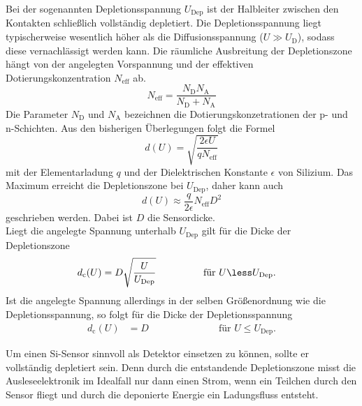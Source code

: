 Bei der sogenannten Depletionsspannung $U_\text{Dep}$ ist der Halbleiter zwischen den Kontakten schließlich vollständig depletiert.
Die Depletionsspannung liegt typischerweise wesentlich höher als die
Diffusionsspannung ($U \gg U_\text{D}$), sodass diese vernachlässigt werden kann. Die räumliche Ausbreitung der Depletionszone hängt von der angelegten Vorspannung und der effektiven Dotierungskonzentration
$N_\text{eff}$ ab.
\begin{equation}
  N_\text{eff} = \frac{N_\text{D}N_\text{A}}{N_\text{D}+N_\text{A}}
\end{equation}
Die Parameter $N_\text{D}$ und $N_\text{A}$ bezeichnen die Dotierungskonzetrationen der p- und n-Schichten. Aus den bisherigen Überlegungen folgt die Formel
\begin{equation}
  d(U) = \sqrt{\frac{2\epsilon U}{q N_\text{eff}}}
\end{equation}
mit der Elementarladung $q$ und der Dielektrischen Konstante $\epsilon$ von Silizium. Das Maximum erreicht die Depletionszone bei $U_\text{Dep}$, daher kann auch
\begin{equation}
  d(U) \approx \frac{q}{2\epsilon} N_\text{eff}D^2
\end{equation}
geschrieben werden. Dabei ist $D$ die Sensordicke.\\
Liegt die angelegte Spannung unterhalb $U_\text{Dep}$ gilt für die Dicke der Depletionszone
\begin{align}
  d_\text{c}(U) &= D\sqrt{\frac{U}{U_\text{Dep}}} \hspace{1.7cm}\text{für } U \less U_\text{Dep}.
  \label{eqn:dicke-depletionszone}
\end{align}
Ist die angelegte Spannung allerdings in der selben Größenordnung wie die Depletionsspannung, so folgt für die Dicke der Depletionsspannung
 \begin{align*}
   d_\text{c}(U) &= D \hspace{3cm}\text{für } U \le U_\text{Dep}.
 \end{align*}

Um einen Si-Sensor sinnvoll als Detektor einsetzen zu können, sollte er vollständig depletiert sein. Denn durch die entstandende Depletionszone misst die Ausleseelektronik im Idealfall nur dann einen Strom, wenn ein Teilchen durch den Sensor fliegt und durch die deponierte Energie ein Ladungsfluss entsteht.

